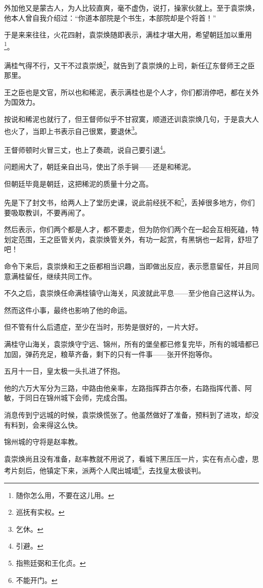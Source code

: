 \begin{multicols}{\theparacolNo}
外加他又是蒙古人，为人比较直爽，毫不虚伪，说打，操家伙就上。至于袁崇焕，他本人曾自我介绍过：“你道本部院是个书生，本部院却是个将首！”

于是来来往往，火花四射，袁崇焕随即表示，满桂才堪大用，希望朝廷加以重用\footnote{随你怎么用，不要在这儿用。}。

满桂气得不行，又干不过袁崇焕\footnote{巡抚有实权。}，就告到了袁崇焕的上司，新任辽东督师王之臣那里。

王之臣也是文官，所以也和稀泥，表示满桂也是个人才，你们都消停吧，都在关外为国效力。

按说和稀泥也就行了，但王督师似乎不甘寂寞，顺道还训袁崇焕几句，于是袁大人也火了，当即上书表示自己很累，要退休\footnote{乞休。}。

王督师顿时火冒三丈，也上了奏疏，说自己要引退\footnote{引避。}。

问题闹大了，朝廷亲自出马，使出了杀手锏——还是和稀泥。

但朝廷毕竟是朝廷，这把稀泥的质量十分之高。

先是下了封文书，给两人上了堂历史课，说此前经抚不和\footnote{指熊廷弼和王化贞。}，丢掉很多地方，你们要吸取教训，不要再闹了。

然后表示，你们两个都是人才，都不要走，但为防你们两个在一起会互相死磕，特划定范围，王之臣管关内，袁崇焕管关外，有功一起赏，有黑锅也一起背，舒坦了吧！

命令下来后，袁崇焕和王之臣都相当识趣，当即做出反应，表示愿意留任，并且同意满桂留任，继续共同工作。

不久之后，袁崇焕任命满桂镇守山海关，风波就此平息——至少他自己这样认为。

然而这件小事，最终也影响了他的命运。

但不管有什么后遗症，至少在当时，形势是很好的，一片大好。

满桂守山海关，袁崇焕守宁远、锦州，所有的堡垒都已修复完毕，所有的城墙都已加固，弹药充足，粮草齐备，剩下的只有一件事——张开怀抱等你。

五月十一日，皇太极一头扎进了怀抱。

他的六万大军分为三路，中路由他亲率，左路指挥莽古尔泰，右路指挥代善、阿敏，于同日在锦州城下会师，完成合围。

消息传到宁远城的时候，袁崇焕慌张了。他虽然做好了准备，预料到了进攻，却没有料到，会来得这么快。

锦州城的守将是赵率教。

袁崇焕尚且没有准备，赵率教就不用说了，看城下黑压压一片，实在有点心虚，思考片刻后，他镇定下来，派两个人爬出城墙\footnote{不能开门。}，去找皇太极谈判。


\end{multicols}
